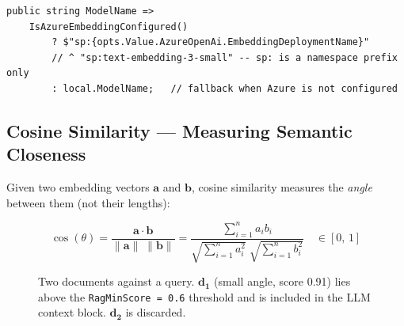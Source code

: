 \documentclass[11pt,a4paper]{article}
\begin{document}
\begin{lstlisting}[language={[Sharp]C},caption={AzureOpenAiEmbeddingService.cs --- ModelName}]
public string ModelName =>
    IsAzureEmbeddingConfigured()
        ? $"sp:{opts.Value.AzureOpenAi.EmbeddingDeploymentName}"
        // ^ "sp:text-embedding-3-small" -- sp: is a namespace prefix only
        : local.ModelName;   // fallback when Azure is not configured
\end{lstlisting}

\subsection{Cosine Similarity --- Measuring Semantic Closeness}

Given two embedding vectors $\mathbf{a}$ and $\mathbf{b}$, cosine similarity
measures the \emph{angle} between them (not their lengths):

\[
\cos(\theta)
= \frac{\mathbf{a}\cdot\mathbf{b}}{\|\mathbf{a}\|\;\|\mathbf{b}\|}
= \frac{\displaystyle\sum_{i=1}^{n}a_i b_i}
       {\displaystyle\sqrt{\sum_{i=1}^{n}a_i^2}\;\sqrt{\sum_{i=1}^{n}b_i^2}}
\quad\in[0,\,1]
\]

\begin{figure}[H]
\centering
{}
\caption{Two documents against a query. $\mathbf{d_1}$ (small angle, score 0.91) lies above
  the \texttt{RagMinScore = 0.6} threshold and is included in the LLM context block.
  $\mathbf{d_2}$ is discarded.}
\end{figure}
\end{document}

